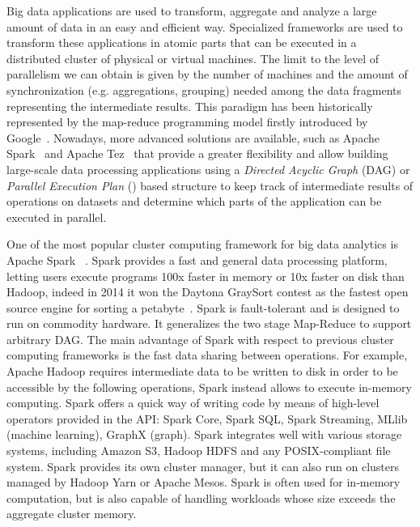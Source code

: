 Big data applications are used to transform, aggregate and analyze a large amount of data in an easy and efficient way. Specialized frameworks are used to transform these applications in atomic parts that can be executed in a distributed cluster of physical or virtual machines. The limit to the level of parallelism we can obtain is given by the number of machines and the amount of synchronization (e.g. aggregations, grouping) needed among the data fragments representing the intermediate results. This paradigm has been historically represented by the map-reduce programming model firstly introduced by Google~\cite{misc:GoogleMapReduce}. Nowadays, more advanced solutions are available, such as Apache Spark~\cite{misc:ApacheSpark} and Apache Tez~\cite{misc:ApacheTez} that provide a greater flexibility and allow building large-scale data processing applications using a \textit{Directed Acyclic Graph} (DAG) or \textit{Parallel Execution Plan} (\plan) based structure to keep track of intermediate results of operations on datasets and determine which parts of the application can be executed in parallel.

One of the most popular cluster computing framework for big data analytics is Apache Spark  ~\cite{articleApacheSpark:2015}. Spark provides a fast and general data processing platform, letting users execute programs 100x faster in memory or 10x faster on disk than Hadoop, indeed in 2014 it won the Daytona GraySort contest as the fastest open source engine for sorting a petabyte~\cite{articleApacheSpark:2016}. Spark is fault-tolerant and is designed to run on commodity hardware. It generalizes the two stage Map-Reduce to support arbitrary DAG. The main advantage of Spark with respect to previous cluster computing frameworks is the fast data sharing between operations. For example, Apache Hadoop requires intermediate data to be written to disk in order to be accessible by the following operations, Spark instead allows to execute in-memory computing. Spark offers a quick way of writing code by means of high-level operators provided in the API: Spark Core, Spark SQL, Spark Streaming, MLlib (machine learning), GraphX (graph). Spark integrates well with various storage systems,  including Amazon S3, Hadoop HDFS and any POSIX-compliant file system. Spark provides its own cluster manager, but it can also run on clusters managed by Hadoop Yarn or Apache Mesos. Spark is often used for in-memory computation, but is also capable of handling workloads whose size exceeds the aggregate cluster memory. 

